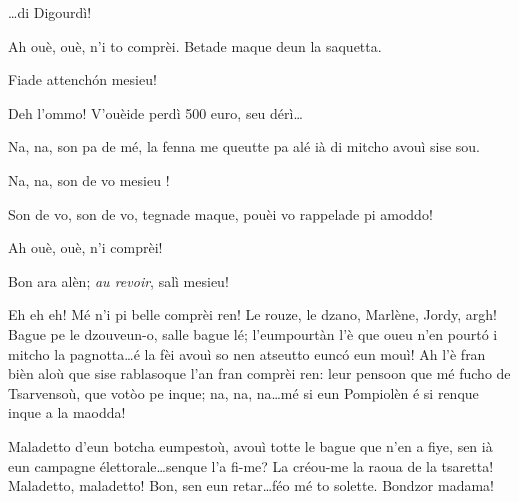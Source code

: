 \begin{drama}
\Joellespeaks  \ldots di Digourdì!


\Pompiolenspeaks Ah ouè, ouè, n'i to comprèi. Betade maque deun la saquetta.


\Joellespeaks  Fiade attench\'on mesieu!

\Dallasspeaks Deh l'ommo! V'ouèide perdì 500 euro, seu dérì\ldots

\Pompiolenspeaks Na, na, son pa de mé, la fenna me queutte pa alé ià di mitcho avouì sise sou.

\Dallasspeaks Na, na, son de vo mesieu \ok !


\Dallasspeaks Son de vo, son de vo, tegnade maque, pouèi vo rappelade pi amoddo!

\Pompiolenspeaks {} Ah ouè, ouè, n'i comprèi!

\Joellespeaks Bon ara alèn; \textit{au revoir}, salì mesieu!


\Pompiolenspeaks {} Eh eh eh!  Mé n'i pi belle comprèi ren! Le rouze, le dzano, Marlène, Jordy, argh! Bague pe le dzouveun-o, salle bague lé; l'eumpourtàn l'è que oueu n'en pourt\'o i mitcho la pagnotta\ldots é la fèi avouì so nen atseutto eunc\'o eun mouì! Ah l'è fran bièn aloù que sise rablasoque l'an fran comprèi ren: leur pensoon que mé fucho de Tsarvensoù, que votòo pe inque; na, na, na\ldots mé si eun Pompiolèn é si renque inque a la maodda!




\Cimaspeaks Maladetto d'eun botcha eumpestoù, avouì totte le bague que n'en a fiye, sen ià eun campagne élettorale\ldots senque l'a fi-me? La créou-me la raoua de la tsaretta! Maladetto, maladetto! Bon, sen eun retar\ldots féo mé to solette. Bondzor madama!


\end{drama}
